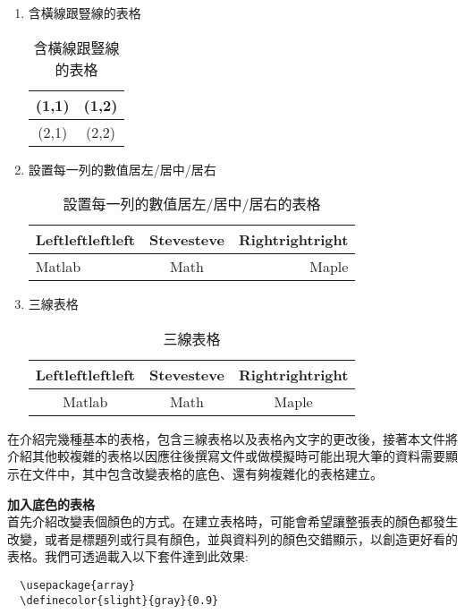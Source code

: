 \begin{enumerate}

\item 含橫線跟豎線的表格
  \begin{table}[h] 
  \centering
  \caption{含橫線跟豎線的表格}\label{tb:line_exam}
  \begin{tabular}{|c|c|}
  \hline
  (1,1) & (1,2)\\
  \hline
  (2,1) & (2,2)\\
  \hline
  \end{tabular}
  \end{table}

\item 設置每一列的數值居左/居中/居右
  \begin{table}[h] 
  \centering
  \caption{設置每一列的數值居左/居中/居右的表格}\label{tb:loc_exam}
  \begin{tabular}{|l|c|r|}
  \hline
  Leftleftleftleft & Stevesteve & Rightrightright\\
  \hline
  Matlab & Math & Maple\\
  \hline
  \end{tabular}
  \end{table}

\item 三線表格
  \begin{table}[h] 
  \centering
  \caption{三線表格}\label{tb:classic_exam}
  \begin{tabular}{ccc}
  \hline
  Leftleftleftleft & Stevesteve & Rightrightright\\
  \hline
  Matlab & Math & Maple\\
  \hline
  \end{tabular}
  \end{table}
\end{enumerate}

在介紹完幾種基本的表格，包含三線表格以及表格內文字的更改後，接著本文件將介紹其他較複雜的表格以因應往後撰寫文件或做模擬時可能出現大筆的資料需要顯示在文件中，其中包含改變表格的底色、還有夠複雜化的表格建立。

\textbf{加入底色的表格}\\
首先介紹改變表個顏色的方式。在建立表格時，可能會希望讓整張表的顏色都發生改變，或者是標題列或行具有顏色，並與資料列的顏色交錯顯示，以創造更好看的表格。我們可透過載入以下套件達到此效果:

\bigskip
\begin{lstlisting}
  \usepackage{array}
  \definecolor{slight}{gray}{0.9}
\end{lstlisting}

